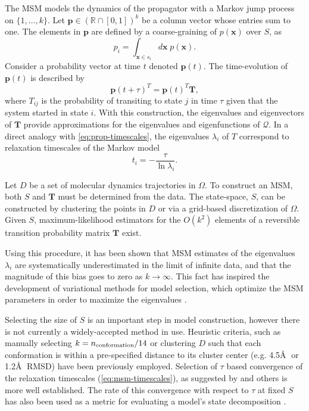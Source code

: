 \documentclass[journal=jpcbfk, layout=traditional, manuscript=article]{achemso}
\begin{document}
The MSM models the dynamics of the propagator with a Markov jump process on $\{1, \ldots, k\}$. Let $\mathbf{p} \in (\mathbb{R} \cap [0,1])^k$ be a column vector whose entries sum to one. The elements in $\mathbf{p}$ are defined by a coarse-graining of $p(\mathbf{x})$ over $S$, as
\begin{equation}
\label{eq:coarse-grain-p}
p_i = \int_{\mathbf{x} \in s_i} d\mathbf{x}\; p(\mathbf{x}).
\end{equation} 
Consider a probability vector at time $t$ denoted $\mathbf{p}(t)$. The time-evolution of $\mathbf{p}(t)$ is described by
\begin{equation}
\mathbf{p}(t+\tau)^T = \mathbf{p}(t)^T \mathbf{T},
\end{equation}
where $T_{ij}$ is the probability of transiting to state $j$ in time $\tau$ given that the system started in state $i$. With this construction, the eigenvalues and eigenvectors of $\mathbf{T}$ provide approximations for the eigenvalues and eigenfunctions of $\mathcal{Q}$. In a direct analogy with \cref{eq:prop-timescales}, the eigenvalues $\lambda_i$ of $T$ correspond to relaxation timescales of the Markov model
\begin{equation}
\label{eq:msm-timescales}
t_i = -\frac{\tau}{\ln \lambda_i}.
\end{equation}

Let $D$ be a set of molecular dynamics trajectories in $\Omega$. To construct an MSM, both $S$ and $\mathbf{T}$ must be determined from the data. The state-space, $S$, can be constructed by clustering the points in $D$ or via a grid-based discretization of $\Omega$. Given $S$, maximum-likelihood estimators for the $O(k^2)$ elements of a reversible transition probability matrix $\mathbf{T}$ exist\cite{Beauchamp2011Msmbuilder2, Prinz2011Markov}.

Using this procedure, it has been shown that MSM estimates of the eigenvalues $\lambda_i$ are systematically underestimated in the limit of infinite data, and that the magnitude of this bias goes to zero as $k\rightarrow \infty$. This fact has inspired the development of variational methods for model selection, which optimize the MSM parameters in order to maximize the eigenvalues \cite{Noe2013Variational}.

Selecting the size of $S$ is an important step in model construction, however there is not currently a widely-accepted method in use. Heuristic criteria, such as manually selecting $k = n_\textnormal{conformation} / 14$ or clustering $D$ such that each conformation is within a pre-specified distance to its cluster center (e.g. 4.5\AA$\;$ or 1.2\AA $\;$ RMSD) have been previously employed\cite{Lane2011Markov, Bowman2012Equilibrium, Beauchamp2012Simple}. Selection of $\tau$ based convergence of the relaxation timescales (\cref{eq:msm-timescales}), as suggested by \citet{Swope2004Describing} and others is more well established. The rate of this convergence with respect to $\tau$ at fixed $S$ has also been used as a metric for evaluating a model's state decomposition \cite{someone}.
\end{document}
